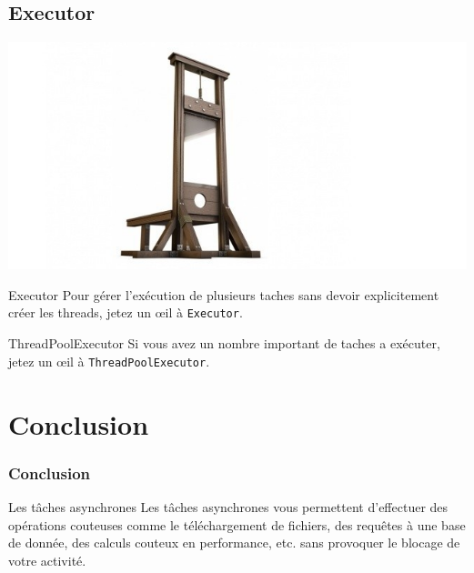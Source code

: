 \documentclass{beamer}
\begin{document}
\subsection{Executor}
\begin{frame}
\begin{center}
\includegraphics[scale=0.25]{executor.jpg}
\end{center}
\begin{block}{Executor}
Pour gérer l'exécution de plusieurs taches sans devoir explicitement créer les threads, jetez un œil à \verb!Executor!.
\end{block}
\begin{block}{ThreadPoolExecutor}
Si vous avez un nombre important de taches a exécuter, jetez un œil à \verb!ThreadPoolExecutor!.
\end{block}

\end{frame}


\section{Conclusion}

\begin{frame}
\frametitle{Conclusion}
\begin{block}{Les tâches asynchrones}
Les tâches asynchrones vous permettent d'effectuer des opérations couteuses comme le téléchargement de fichiers, des requêtes à une base de donnée, des calculs couteux en performance, etc. sans provoquer le blocage de votre activité.
\end{block}
\end{frame}
\end{document}
